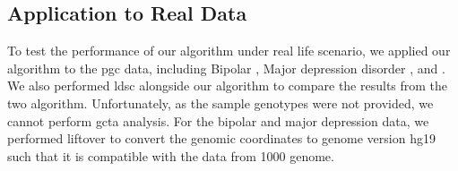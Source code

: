 	
	\subsection{Application to Real Data}
	\label{sec:realData}
	To test the performance of our algorithm under real life scenario, we applied our algorithm to the \gls{pgc} data, including Bipolar \citep{PsychiatricGWASConsortiumBipolarDisorderWorkingGroup2011}, Major depression disorder \citep{Ripke2013b}, and  \citep{Ripke2014}.
	We also performed \gls{ldsc} alongside our algorithm to compare the results from the two algorithm.
	Unfortunately, as the sample genotypes were not provided, we cannot perform \gls{gcta} analysis.
	For the bipolar and major depression data, we performed liftover \citep{Hinrichs2006} to convert the genomic coordinates to genome version hg19 such that it is compatible with the data from 1000 genome.
	

